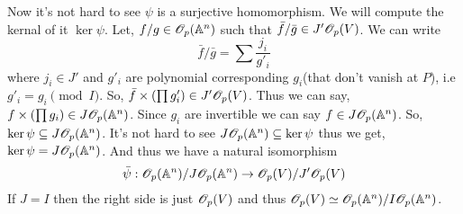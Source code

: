 \documentclass[12pt]{article}
\begin{document}
Now it's not hard to see $\psi$ is a surjective homomorphism. We will compute the kernal of it $\ker \psi$. Let, $f/g \in \mathscr{O}_p(\mathbb{A}^n)$ such that $\bar{f}/\bar{g} \in J'\mathscr{O}_p(V)$. We can write $$\bar{f}/\bar{g} = \sum \frac{j_i}{g'_i}$$ where $j_i \in J'$ and $g'_i$ are polynomial corresponding $g_i$(that don't vanish at $P$), i.e $g'_i =g_i \pmod{I}$. So, $\bar{f} \times \qty(\prod g'_i) \in J'\mathscr{O}_p(V)$. Thus we can say, $f \times \qty(\prod g_i) \in J\mathscr{O}_p(\mathbb{A}^n)$. Since $g_i$ are invertible we can say $f \in J\mathscr{O}_p(\mathbb{A}^n)$. So, $\ker \psi \subseteq J\mathscr{O}_p(\mathbb{A}^n)$. It's not hard to see $J\mathscr{O}_p(\mathbb{A}^n) \subseteq \ker \psi$ thus we get, $\ker \psi = J\mathscr{O}_p(\mathbb{A}^n)$. And thus we have a natural isomorphism $$\bar{\psi}: \mathscr{O}_p(\mathbb{A}^n)/J\mathscr{O}_p(\mathbb{A}^n) \to \mathscr{O}_p(V)/J'\mathscr{O}_p(V)$$  If $J=I$ then the right side is just $\mathscr{O}_p(V)$ and thus $\mathscr{O}_p(V)\simeq \mathscr{O}_p(\mathbb{A}^n)/I\mathscr{O}_p(\mathbb{A}^n)$.
\end{document}
